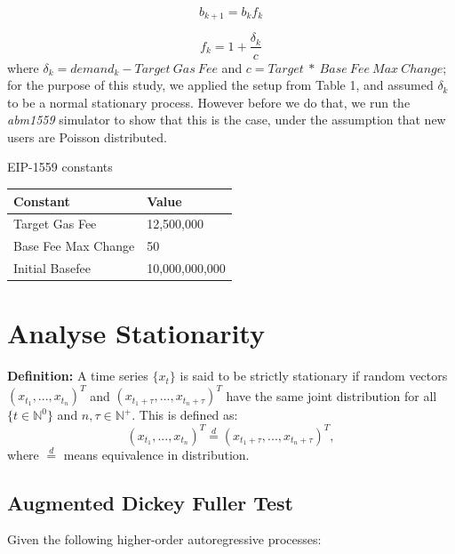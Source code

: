 \documentclass[futureinternet,article,submit,moreauthors,dvi2pdf]{mdpi}
\begin{document}
\begin{equation}
b_{k+1} = b_{k}f_{k}
\label{eq:eip1559} 
\end{equation}

\begin{equation}
f_{k} = 1 + \frac{\delta_{k}}{c}
\label{eq:fk} 
\end{equation}
where $\delta_{k} = demand_{k} - Target~Gas~Fee$ and $c = Target ~*~ Base~Fee~Max~Change$; for the purpose of this study, we applied the setup from Table 1, and assumed $\delta_{k}$ to be a normal stationary process. However before we do that, we run the \textit{abm1559} simulator \cite{Mon21} to show that this is the case, under the assumption that new users are Poisson distributed.

\begin{specialtable}[H] 
\caption{EIP-1559 constants}
\begin{tabular}{ ll } 
\toprule
 Constant & Value \\
\midrule
Target Gas Fee & 12,500,000 \\
Base Fee Max Change & 50 \\
Initial Basefee & 10,000,000,000\\
\bottomrule
\end{tabular}
\end{specialtable}

\section{Analyse Stationarity}
\label{section:analyze_stationarity}

\textbf{Definition:} A time series $\{x_{t}\}$ is said to be strictly stationary if random vectors $(x_{t_{1}} , ... , x_{t_{n}} )^T $ and $(x_{t_{1}+\tau} , ... , x_{t_{n}+\tau} )^T$ have the same joint distribution for all $\{t \in \mathbb{N}^{0}\}$ and $n,\tau \in \mathbb{N}^{+}$. This is defined as:
\begin{equation}
(x_{t_{1}} , ... , x_{t_{n}})^T \stackrel{d}{=} (x_{t_{1}+\tau} , ... , x_{t_{n}+\tau} )^T,
\label{eq:ar1} 
\end{equation}
where $\stackrel{d}{=}$ means equivalence in distribution.

\subsection{Augmented Dickey Fuller Test}
\label{section:adf}

Given the following higher-order autoregressive processes:
\end{document}
